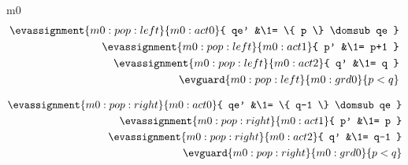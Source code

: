 \documentclass[12pt]{amsart}
\begin{document}
\begin{machine}{m0}
\begin{align*}
\evassignment{m0:pop:left}{m0:act0}{ qe' &\1= \{ p \} \domsub qe }
\\ \evassignment{m0:pop:left}{m0:act1}{ p' &\1= p+1 }
\\ \evassignment{m0:pop:left}{m0:act2}{ q' &\1= q }
\\ \evguard{m0:pop:left}{m0:grd0}{ p < q }
\end{align*}


\begin{align*}
\evassignment{m0:pop:right}{m0:act0}{ qe' &\1= \{ q-1 \} \domsub qe }
\\ \evassignment{m0:pop:right}{m0:act1}{ p' &\1= p }
\\ \evassignment{m0:pop:right}{m0:act2}{ q' &\1= q-1 }
\\ \evguard{m0:pop:right}{m0:grd0}{ p < q }
\end{align*}

\end{machine}
\end{document}
